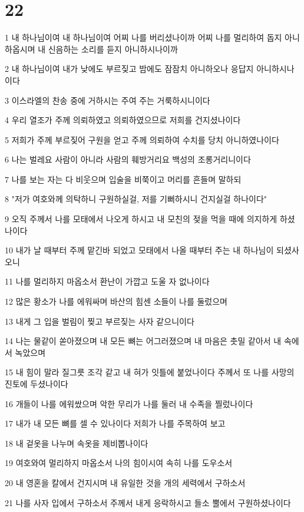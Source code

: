 \chapter{22}

\par 1 내 하나님이여 내 하나님이여 어찌 나를 버리셨나이까 어찌 나를 멀리하여 돕지 아니하옵시며 내 신음하는 소리를 듣지 아니하시나이까
\par 2 내 하나님이여 내가 낮에도 부르짖고 밤에도 잠잠치 아니하오나 응답지 아니하시나이다
\par 3 이스라엘의 찬송 중에 거하시는 주여 주는 거룩하시니이다
\par 4 우리 열조가 주께 의뢰하였고 의뢰하였으므로 저희를 건지셨나이다
\par 5 저희가 주께 부르짖어 구원을 얻고 주께 의뢰하여 수치를 당치 아니하였나이다
\par 6 나는 벌레요 사람이 아니라 사람의 훼방거리요 백성의 조롱거리니이다
\par 7 나를 보는 자는 다 비웃으며 입술을 비쭉이고 머리를 흔들며 말하되
\par 8 "저가 여호와께 의탁하니 구원하실걸, 저를 기뻐하시니 건지실걸 하나이다"
\par 9 오직 주께서 나를 모태에서 나오게 하시고 내 모친의 젖을 먹을 때에 의지하게 하셨나이다
\par 10 내가 날 때부터 주께 맡긴바 되었고 모태에서 나올 때부터 주는 내 하나님이 되셨사오니
\par 11 나를 멀리하지 마옵소서 환난이 가깝고 도울 자 없나이다
\par 12 많은 황소가 나를 에워싸며 바산의 힘센 소들이 나를 둘렀으며
\par 13 내게 그 입을 벌림이 찢고 부르짖는 사자 같으니이다
\par 14 나는 물같이 쏟아졌으며 내 모든 뼈는 어그러졌으며 내 마음은 촛밀 같아서 내 속에서 녹았으며
\par 15 내 힘이 말라 질그릇 조각 같고 내 혀가 잇틀에 붙었나이다 주께서 또 나를 사망의 진토에 두셨나이다
\par 16 개들이 나를 에워쌌으며 악한 무리가 나를 둘러 내 수족을 찔렀나이다
\par 17 내가 내 모든 뼈를 셀 수 있나이다 저희가 나를 주목하여 보고
\par 18 내 겉옷을 나누며 속옷을 제비뽑나이다
\par 19 여호와여 멀리하지 마옵소서 나의 힘이시여 속히 나를 도우소서
\par 20 내 영혼을 칼에서 건지시며 내 유일한 것을 개의 세력에서 구하소서
\par 21 나를 사자 입에서 구하소서 주께서 내게 응락하시고 들소 뿔에서 구원하셨나이다
